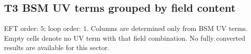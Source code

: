 \documentclass[8pt]{article}
\begin{document}
\begin{landscape}
\section*{T3 BSM UV terms grouped by field content}
EFT order: $5$; loop order: $1$. 
Columns are determined only from BSM UV terms. Empty cells denote no UV term with that field combination.
\tiny
No fully converted results are available for this sector.
\end{landscape}
\end{document}
